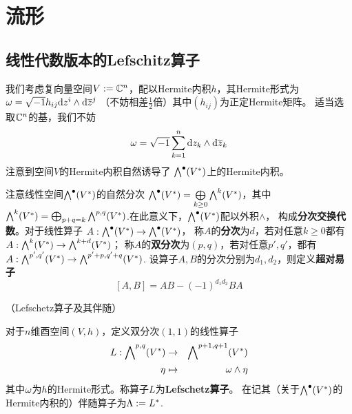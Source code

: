 \chapter{\Kahler 流形}

\section{线性代数版本的Lefschitz算子}


我们考虑复向量空间$V:=\mathbb{C}^n$，配以Hermite内积$h$，其Hermite形式为
$\omega=\sqrt{-1} h_{ij}\mathrm{d} z^i\wedge\mathrm{d}\overline{z}^j$
（不妨相差$\frac{1}{2}$倍）其中$(h_{ij})$为正定Hermite矩阵。
适当选取$\mathbb{C}^n$的基，我们不妨
$$\omega=\sqrt{-1}\sum_{k=1}^n\mathrm{d} z_k\wedge\mathrm{d}\overline{z}_k$$
注意到空间$V$的Hermite内积自然诱导了
$\bigwedge\nolimits^{\bullet}(V^*)$上的Hermite内积。

注意线性空间$\bigwedge\nolimits^{\bullet}(V^*)$的自然分次
$
  \bigwedge\nolimits^{\bullet}(V^*)
=\bigoplus\limits_{k\geq 0}\bigwedge\nolimits^{k}(V^*)
$，其中$
  \bigwedge\nolimits^{k}(V^*)
=
  \bigoplus_{p+q=k}\bigwedge\nolimits^{p,q}(V^*)
$.在此意义下，$\bigwedge\nolimits^{\bullet}(V^*)$配以外积$\wedge$，
构成\textbf{分次交换代数}。对于线性算子
$A:\bigwedge\nolimits^{\bullet}(V^*)\to \bigwedge\nolimits^{\bullet}(V^*)$，
称$A$的\textbf{分次}为$d$，若对任意$k\geq 0$都有
$A:\bigwedge\nolimits^{k}(V^*)\to \bigwedge\nolimits^{k+d}(V^*)$；
称$A$的\textbf{双分次}为$(p,q)$，若对任意$p',q'$，都有
$A:\bigwedge\nolimits^{p',q'}(V^*)\to \bigwedge\nolimits^{p'+p,q'+q}(V^*)$.
设算子$A,B$的分次分别为$d_1,d_2$，则定义\textbf{超对易子}
$$[A,B]=AB-(-1)^{d_1d_2}BA$$


\begin{definition}（Lefschetz算子及其伴随）

对于$n$维酉空间$(V,h)$，定义双分次$(1,1)$的线性算子
\begin{eqnarray*}
  L:\bigwedge\nolimits^{p,q}(V^*)&\to&\bigwedge\nolimits^{p+1,q+1}(V^*)\\
                    \eta&\mapsto&\omega\wedge\eta
\end{eqnarray*}
其中$\omega$为$h$的Hermite形式。称算子$L$为\textbf{Lefschetz算子}。
在记其（关于$\bigwedge\nolimits^{\bullet}(V^*)$的Hermite内积的）伴随算子为$\Lambda:=L^*$.
\end{definition}

